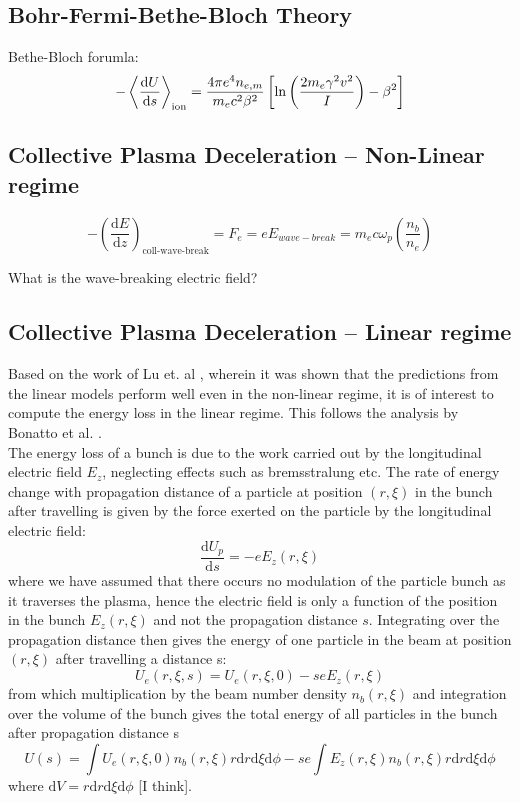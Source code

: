 \documentclass[%
onecolumn, notitlepage,
 amsmath,amssymb,
 aps,
]{article}
\begin{document}
\subsection{Bohr-Fermi-Bethe-Bloch Theory}
Bethe-Bloch forumla:
\begin{equation}
-\expval{\frac{\mathrm{d}U}{\mathrm{d}s}}_{\text{ion}}=\frac{4\pi e^4n_{e,m}}{m_ec^2\beta^2}\left[\ln\left(\frac{2m_e\gamma^2v^2}{I}\right) -\beta^2\right]
\end{equation}

\subsection{Collective Plasma Deceleration -- Non-Linear regime }

\begin{equation}
-\left(\frac{\mathrm{d}E}{\mathrm{d}z}\right)_{\text{coll-wave-break}}=F_e=eE_{wave-break}=m_e c\omega_{p}\left(\frac{n_b}{n_e}\right)
\end{equation}

What is the wave-breaking electric field?



\subsection{Collective Plasma Deceleration -- Linear regime }
Based on the work of Lu et. al \citep{Lu2006}, wherein it was shown that the predictions from the linear models perform well even in the non-linear regime, it is of interest to compute the energy loss in the linear regime. This follows the analysis by Bonatto et al. \citep{Bonatto2016}.\\
The energy loss of a bunch is due to the work carried out by the longitudinal electric field $E_z$, neglecting effects such as bremsstralung etc. The rate of energy change with propagation distance of a particle at position $(r,\xi)$ in the bunch after travelling is given by the force exerted on the particle by the longitudinal electric field:
\begin{equation}
\frac{\mathrm{d}U_p}{\mathrm{d}s}=-eE_z(r,\xi)
\end{equation}
where we have assumed that there occurs no modulation of the particle bunch as it traverses the plasma, hence the electric field is only a function of the position in the bunch $E_z(r,\xi)$ and not the propagation distance $s$. Integrating over the propagation distance then gives the energy of one particle in the beam at position $(r,\xi)$ after travelling a distance s:
\begin{equation}
U_e(r,\xi,s)=U_e(r,\xi,0)-seE_z(r,\xi)
\end{equation}
from which multiplication by the beam number density $n_b(r,\xi)$ and integration over the volume of the bunch gives the total energy of all particles in the bunch after propagation distance s
\begin{equation}
U(s)=\int  U_e(r,\xi,0)n_b(r,\xi)r\mathrm{d}r\mathrm{d}\xi\mathrm{d}\phi-se\int E_z(r,\xi)n_b(r,\xi)r\mathrm{d}r\mathrm{d}\xi\mathrm{d}\phi
\end{equation}
where $\mathrm{d}V=r\mathrm{d}r\mathrm{d}\xi\mathrm{d}\phi$ [I think].
\end{document}
